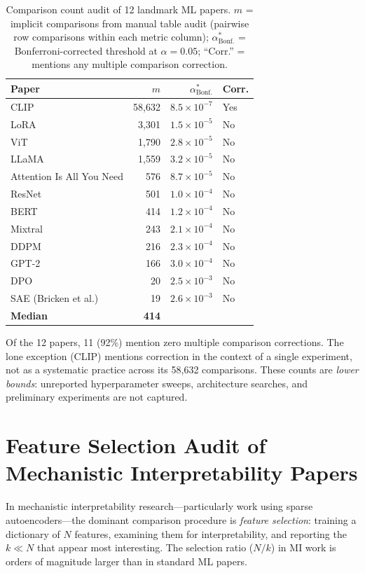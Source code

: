 \documentclass{article}
\begin{document}
\begin{table}[h]
\centering
\caption{Comparison count audit of 12 landmark ML papers. $m$ = implicit comparisons from manual table audit (pairwise row comparisons within each metric column); $\alpha^*_{\text{Bonf.}}$ = Bonferroni-corrected threshold at $\alpha = 0.05$; ``Corr.'' = mentions any multiple comparison correction.}
\label{tab:fwer_audit}
\small
\begin{tabular}{@{}lrrl@{}}
\toprule
Paper & $m$ & $\alpha^*_{\text{Bonf.}}$ & Corr. \\
\midrule
CLIP & 58{,}632 & $8.5 \times 10^{-7}$ & Yes \\
LoRA & 3{,}301 & $1.5 \times 10^{-5}$ & No \\
ViT & 1{,}790 & $2.8 \times 10^{-5}$ & No \\
LLaMA & 1{,}559 & $3.2 \times 10^{-5}$ & No \\
Attention Is All You Need & 576 & $8.7 \times 10^{-5}$ & No \\
ResNet & 501 & $1.0 \times 10^{-4}$ & No \\
BERT & 414 & $1.2 \times 10^{-4}$ & No \\
Mixtral & 243 & $2.1 \times 10^{-4}$ & No \\
DDPM & 216 & $2.3 \times 10^{-4}$ & No \\
GPT-2 & 166 & $3.0 \times 10^{-4}$ & No \\
DPO & 20 & $2.5 \times 10^{-3}$ & No \\
SAE (Bricken et al.) & 19 & $2.6 \times 10^{-3}$ & No \\
\midrule
\textbf{Median} & \textbf{414} & & \\
\bottomrule
\end{tabular}
\end{table}

Of the 12 papers, 11 (92\%) mention zero multiple comparison corrections. The lone exception (CLIP) mentions correction in the context of a single experiment, not as a systematic practice across its 58,632 comparisons. These counts are \textit{lower bounds}: unreported hyperparameter sweeps, architecture searches, and preliminary experiments are not captured.


\section{Feature Selection Audit of Mechanistic Interpretability Papers}
\label{app:mi_audit}

In mechanistic interpretability research---particularly work using sparse autoencoders---the dominant comparison procedure is \textit{feature selection}: training a dictionary of $N$ features, examining them for interpretability, and reporting the $k \ll N$ that appear most interesting. The selection ratio ($N/k$) in MI work is orders of magnitude larger than in standard ML papers.
\end{document}
